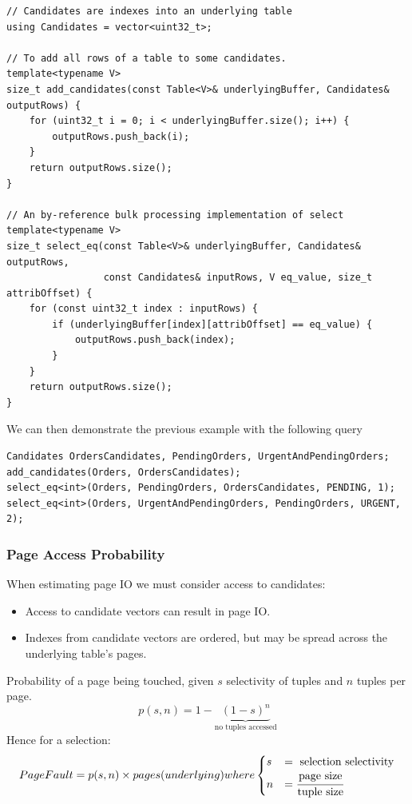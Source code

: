 \begin{verbatim}
// Candidates are indexes into an underlying table
using Candidates = vector<uint32_t>;

// To add all rows of a table to some candidates.
template<typename V>
size_t add_candidates(const Table<V>& underlyingBuffer, Candidates& outputRows) {
    for (uint32_t i = 0; i < underlyingBuffer.size(); i++) {
        outputRows.push_back(i);
    }
    return outputRows.size();
}

// An by-reference bulk processing implementation of select
template<typename V>
size_t select_eq(const Table<V>& underlyingBuffer, Candidates& outputRows, 
                 const Candidates& inputRows, V eq_value, size_t attribOffset) {
    for (const uint32_t index : inputRows) {
        if (underlyingBuffer[index][attribOffset] == eq_value) {
            outputRows.push_back(index);
        }
    }
    return outputRows.size();
}
\end{verbatim}
We can then demonstrate the previous example with the following query
\begin{verbatim}
Candidates OrdersCandidates, PendingOrders, UrgentAndPendingOrders;
add_candidates(Orders, OrdersCandidates);
select_eq<int>(Orders, PendingOrders, OrdersCandidates, PENDING, 1);
select_eq<int>(Orders, UrgentAndPendingOrders, PendingOrders, URGENT, 2);
\end{verbatim}

\subsubsection{Page Access Probability}
When estimating page IO we must consider access to candidates:
\begin{itemize}
  \item Access to candidate vectors can result in page IO.
  \item Indexes from candidate vectors are ordered, but may be spread across the underlying table's pages.
\end{itemize}
Probability of a page being touched, given $s$ selectivity of tuples and $n$ tuples per page.
\[p(s,n) = 1 - \underbrace{(1-s)^n}_{\text{no tuples accessed}}\]
Hence for a selection:
\[PageFault = p(s,n) \times pages(underlying) where \begin{cases}
    s & = \text{ selection selectivity}               \\
    n & = \cfrac{\text{page size}}{\text{tuple size}} \\
  \end{cases}\]

